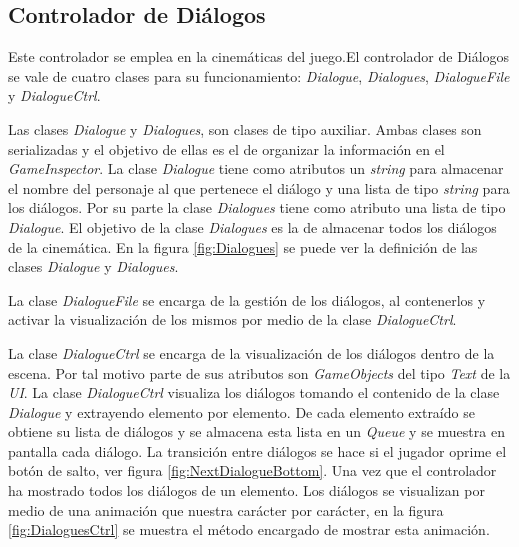\subsection{Controlador de Diálogos}\label{ControladorDialogo}
Este controlador se emplea en la cinemáticas del juego.El controlador de
Diálogos se vale de cuatro clases para su funcionamiento:
\textit{Dialogue}, \textit{Dialogues}, \textit{DialogueFile} y
\textit{DialogueCtrl}.
\\
\par
Las clases \textit{Dialogue} y \textit{Dialogues}, son clases de tipo auxiliar. Ambas clases son serializadas y el objetivo de ellas es el de organizar la información en el \textit{GameInspector}. La clase \textit{Dialogue} tiene como atributos un \textit{string} para almacenar el nombre del personaje al que pertenece el diálogo y una lista de tipo \textit{string} para los diálogos. Por su parte la clase \textit{Dialogues} tiene como atributo una lista de tipo \textit{Dialogue}. El objetivo de la clase \textit{Dialogues} es la de almacenar todos los diálogos de la cinemática. En la figura \ref{fig:Dialogues} se puede ver la definición de las clases \textit{Dialogue} y \textit{Dialogues}.
\\
\par
La clase \textit{DialogueFile} se encarga de la gestión de los diálogos, al contenerlos y activar la visualización de los mismos por medio de la clase \textit{DialogueCtrl}.
\\
\par
La clase \textit{DialogueCtrl} se encarga de la visualización de los diálogos
dentro de la escena. Por tal motivo parte de sus atributos son
\textit{GameObjects} del tipo \textit{Text} de la \textit{UI}. La clase
\textit{DialogueCtrl} visualiza los diálogos tomando el contenido de la clase
\textit{Dialogue} y extrayendo elemento por elemento. De cada elemento extraído
se obtiene su lista de diálogos y se almacena esta lista en un \textit{Queue} y
se muestra en pantalla cada diálogo. La transición entre diálogos se hace si el
jugador oprime el botón de salto, ver figura \ref{fig:NextDialogueBottom}. Una
vez que el controlador ha mostrado todos los diálogos de un elemento. Los
diálogos se visualizan por medio de una animación que nuestra carácter por
carácter, en la figura \ref{fig:DialoguesCtrl} se muestra el método encargado de
mostrar esta animación.   

